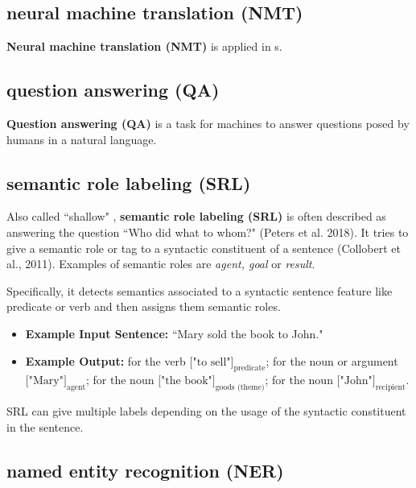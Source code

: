 \subsection{neural machine translation (NMT)} \label{nlptask:neuralmachinetranslationNMT}

\textbf{Neural machine translation (NMT)} is  applied in s. 


\subsection{question answering (QA)} \label{nlptask:questionansweringQA}

\textbf{Question answering (QA)} is a task for machines to answer questions posed by humans in a natural language. 


\subsection{semantic role labeling (SRL)} \label{nlptask:semanticrolelabelingSRL}

Also called ``shallow"  , \textbf{semantic role labeling (SRL)} is often described as answering the question ``Who did what to whom?" (Peters et al. 2018). It tries to give a semantic role or tag to a syntactic constituent of a sentence (Collobert et al., 2011).  Examples of semantic roles are \emph{agent, goal} or \emph{result}. 

Specifically, it detects semantics associated to a syntactic sentence feature like predicate or verb and then assigns them semantic roles. 
\begin{itemize}
    \item \textbf{Example Input Sentence: } ``Mary sold the book to John."
    
    \item \textbf{Example Output: } for the verb $\Big[ \text{"to sell"}\Big]_\text{predicate}$; for the noun or argument $\Big[ \text{"Mary"}\Big]_\text{agent}$; for the noun $\Big[ \text{"the book"}\Big]_\text{goods (theme)}$; for the noun $\Big[ \text{"John"}\Big]_\text{recipient}$.
\end{itemize}

SRL can give multiple labels depending on the usage of the syntactic constituent in the sentence. 



\subsection{named entity recognition (NER)} \label{nlptask:namedentityrecognitionNER}

